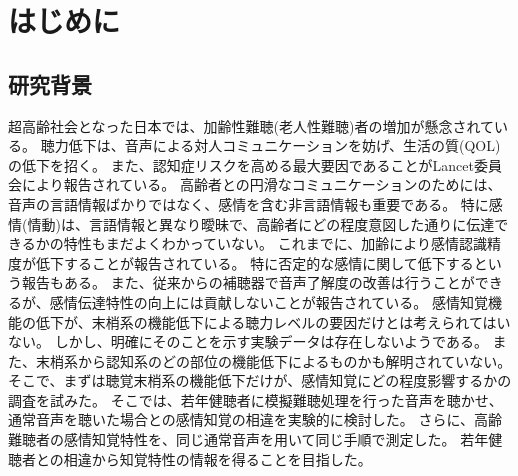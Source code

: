 
\chapter{はじめに}
\label{chap:Intro}


\section{研究背景}
\label{sec:研究背景}
超高齢社会となった日本では、加齢性難聴(老人性難聴)者の増加が懸念されている。
聴力低下は、音声による対人コミュニケーションを妨げ、生活の質(QOL)の低下を招く。
また、認知症リスクを高める最大要因であることがLancet委員会により報告されている\cite{livingston2020dementia}。
高齢者との円滑なコミュニケーションのためには、音声の言語情報ばかりではなく、感情を含む非言語情報も重要である。
特に感情(情動)は、言語情報と異なり曖昧で、高齢者にどの程度意図した通りに伝達できるかの特性もまだよくわかっていない。
これまでに、加齢により感情認識精度が低下することが報告されている\cite{paulmann2008aging,ben2019age,amorim2021changes}。
特に否定的な感情に関して低下するという報告もある\cite{mill2009age}。
また、従来からの補聴器で音声了解度の改善は行うことができるが、感情伝達特性の向上には貢献しないことが報告されている\cite{goy2018hearing}。
感情知覚機能の低下が、末梢系の機能低下による聴力レベルの要因だけとは考えられてはいない。
しかし、明確にそのことを示す実験データは存在しないようである。
また、末梢系から認知系のどの部位の機能低下によるものかも解明されていない。
そこで、まずは聴覚末梢系の機能低下だけが、感情知覚にどの程度影響するかの調査を試みた。
そこでは、若年健聴者に模擬難聴処理を行った音声を聴かせ、通常音声を聴いた場合との感情知覚の相違を実験的に検討した。
さらに、高齢難聴者の感情知覚特性を、同じ通常音声を用いて同じ手順で測定した。
若年健聴者との相違から知覚特性の情報を得ることを目指した。

